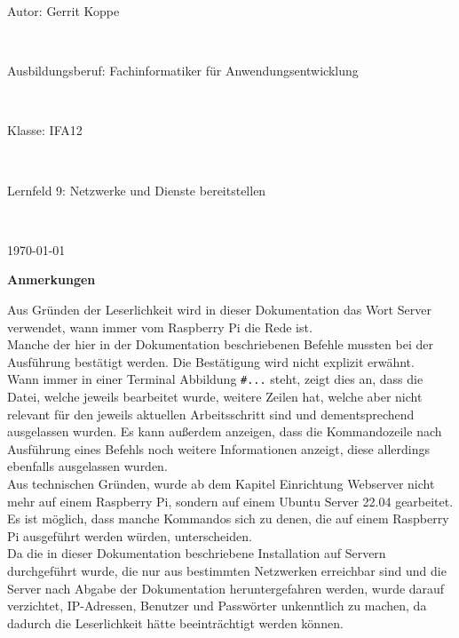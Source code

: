 \documentclass[a4paper, 12pt]{scrartcl}
\begin{document}
\begin{center}
    \vspace{0.1\textheight}
    \begin{Large}
        Autor: Gerrit Koppe
    \end{Large}
    \\
    \vspace{0.5cm}
    \begin{Large}
        Ausbildungsberuf: Fachinformatiker für Anwendungsentwicklung
    \end{Large}
    \\
    \vspace{0.5cm}
    \begin{Large}
        Klasse: IFA12
    \end{Large}
    \\
    \vspace{0.5cm}
    \begin{Large}
        Lernfeld 9: Netzwerke und Dienste bereitstellen
    \end{Large}
    \\
    \vspace{0.5cm}
    \begin{Large}
        \today
    \end{Large}
\end{center}
\newpage
\thispagestyle{empty}
\begin{Large}
    \begin{flushleft}
        \textbf{\textcolor{BBS}{Anmerkungen}}
    \end{flushleft}
\end{Large}
Aus Gründen der Leserlichkeit wird in dieser Dokumentation das Wort \glqq Server\grqq{} verwendet, wann immer vom Raspberry Pi die Rede ist.
\\
Manche der hier in der Dokumentation beschriebenen Befehle mussten bei der Ausführung bestätigt werden. Die Bestätigung wird nicht explizit
erwähnt.
\\
Wann immer in einer Terminal Abbildung \glqq\lstinline[basicstyle={\small\ttfamily\color{black}}]|#...|\grqq{} steht, zeigt dies an, dass die Datei, welche jeweils bearbeitet wurde,
weitere Zeilen hat, welche aber nicht relevant für den jeweils aktuellen Arbeitsschritt sind und dementsprechend ausgelassen wurden. Es kann außerdem anzeigen, dass
die Kommandozeile nach Ausführung eines Befehls noch weitere Informationen anzeigt, diese allerdings ebenfalls ausgelassen wurden.
\\
Aus technischen Gründen, wurde ab dem Kapitel \glqq Einrichtung Webserver\grqq{} nicht mehr auf einem Raspberry Pi, sondern auf einem Ubuntu Server 22.04 gearbeitet. Es ist möglich,
dass manche Kommandos sich zu denen, die auf einem Raspberry Pi ausgeführt werden würden, unterscheiden.
\\
Da die in dieser Dokumentation beschriebene Installation auf Servern durchgeführt wurde, die nur aus bestimmten Netzwerken erreichbar sind und die Server nach Abgabe der Dokumentation
heruntergefahren werden, wurde darauf verzichtet, IP-Adressen, Benutzer und Passwörter unkenntlich zu machen, da dadurch die Leserlichkeit hätte beeinträchtigt werden können.
\end{document}
